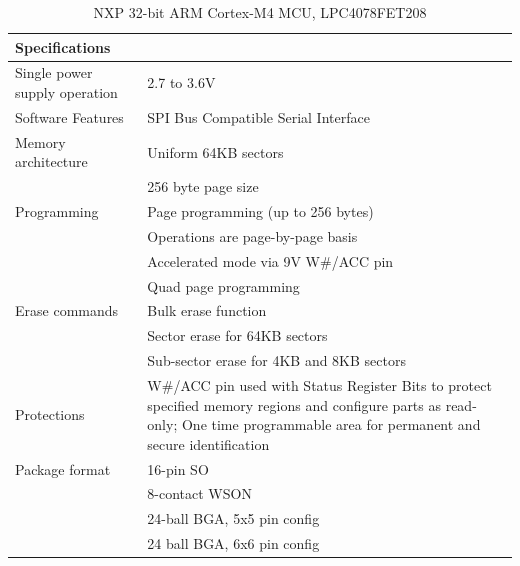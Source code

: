 \begin{table}
    \centering
    \label{fig:LPC4078FET208}%
    \caption{NXP 32-bit ARM Cortex-M4 MCU, LPC4078FET208 \autocite{alldatasheet.comLPC4078FET208DatasheetPDF}}
    \begin{tabular}{|p{4cm}|p{12cm}|}
      \hline\rowcolor{gray!30}
  
      \textbf{Specifications} &  \\
      \hline
  
      Single power supply operation & 2.7 to 3.6V \\
      \hline
  
      Software Features & SPI Bus Compatible Serial Interface \\
      \hline
  
      Memory architecture & Uniform 64KB sectors \\
      & 256 byte page size \\
      \hline
  
      Programming & Page programming (up to 256 bytes) \\
      & Operations are page-by-page basis \\
      & Accelerated mode via 9V W\#/ACC pin \\
      & Quad page programming \\
      \hline
  
      Erase commands & Bulk erase function \\
       & Sector erase for 64KB sectors \\
       & Sub-sector erase for 4KB and 8KB sectors \\
      \hline
  
      Protections & W\#/ACC pin used with Status Register Bits to protect specified memory regions and configure parts as read-only; One time programmable area for permanent and secure identification \\
      \hline
  
      Package format & 16-pin SO \\
      & 8-contact WSON \\
      & 24-ball BGA, 5x5 pin config \\
      & 24 ball BGA, 6x6 pin config \\
      \hline
  
    \end{tabular}
\end{table}

